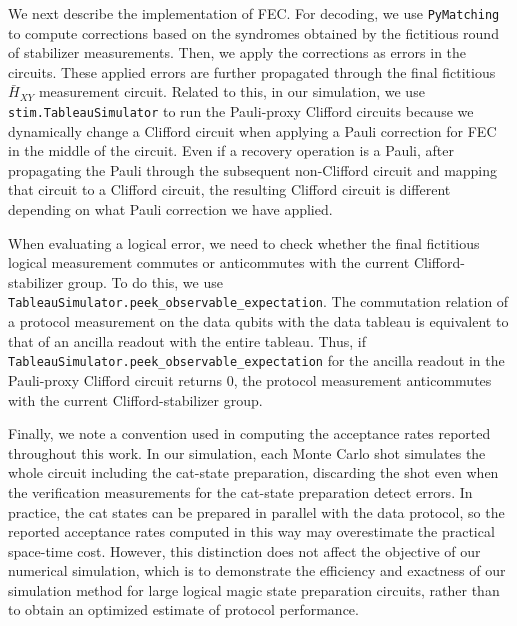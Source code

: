 \documentclass[
 reprint,
 amsmath,amssymb,
 pra,superscriptaddress, nofootinbib
]{revtex4-2}
\theoremstyle{definition}
\theoremstyle{plain}
\begin{document}
We next describe the implementation of FEC. For decoding, we use \texttt{PyMatching}~\cite{Higgott2025sparseblossom} to compute corrections based on the syndromes obtained by the fictitious round of stabilizer measurements. 
Then, we apply the corrections as errors in the circuits. These applied errors are further propagated through the final fictitious $\bar{H}_{XY}$ measurement circuit. 
Related to this, in our simulation, we use \texttt{stim.TableauSimulator} to run the Pauli-proxy Clifford circuits because we dynamically change a Clifford circuit when applying a Pauli correction for FEC in the middle of the circuit.
Even if a recovery operation is a Pauli, after propagating the Pauli through the subsequent non-Clifford circuit and mapping that circuit to a Clifford circuit, the resulting Clifford circuit is different depending on what Pauli correction we have applied. 

When evaluating a logical error, we need to check whether the final fictitious logical measurement commutes or anticommutes with the current Clifford-stabilizer group. 
To do this, we use \texttt{TableauSimulator.peek\_observable\_expectation}. 
The commutation relation of a protocol measurement on the data qubits with the data tableau is equivalent to that of an ancilla readout with the entire tableau. Thus, if \texttt{TableauSimulator.peek\_observable\_expectation} for the ancilla readout in the Pauli-proxy Clifford circuit returns $0$, the protocol measurement anticommutes with the current Clifford-stabilizer group. 

Finally, we note a convention used in computing the acceptance rates reported throughout this work.
In our simulation, each Monte Carlo shot simulates the whole circuit including the cat-state preparation, discarding the shot even when the verification measurements for the cat-state preparation detect errors.
In practice, the cat states can be prepared in parallel with the data protocol, so the reported acceptance rates computed in this way may overestimate the practical space-time cost. 
However, this distinction does not affect the objective of our numerical simulation, which is to demonstrate the efficiency and exactness of our simulation method for large logical magic state preparation circuits, rather than to obtain an optimized estimate of protocol performance.
\end{document}
